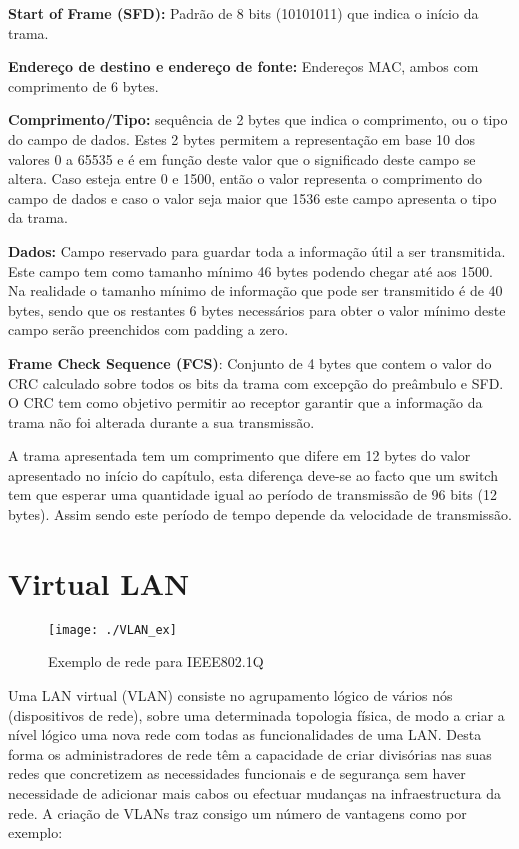 \documentclass[a4paper]{IEEEtran}
\begin{document}
\textbf{Start of Frame (SFD):}  Padrão de 8 bits (10101011) que indica o início da trama.

\textbf{Endereço de destino e endereço de fonte:} Endereços MAC, ambos com comprimento de 6 bytes.

\textbf{Comprimento/Tipo:}  sequência de 2 bytes que indica o comprimento, ou o tipo do campo de dados. Estes 2 bytes permitem a representação em base 10 dos valores 0 a 65535 e é em função deste valor que o significado deste campo se altera. Caso esteja entre 0 e 1500, então o  valor representa o comprimento do campo de dados e caso o valor seja maior que 1536 este campo apresenta o tipo da trama.

\textbf{Dados:} Campo reservado para guardar toda a informação útil a ser transmitida. Este campo tem como tamanho mínimo 46 bytes podendo chegar até aos 1500. Na realidade o tamanho mínimo de informação que pode ser transmitido é de 40 bytes, sendo que os restantes 6 bytes necessários para obter o valor mínimo deste campo serão preenchidos com padding a zero.

\textbf{Frame Check Sequence (FCS)}: Conjunto de 4 bytes que contem o valor do CRC calculado sobre todos os bits da trama com excepção do preâmbulo e SFD. O CRC tem como objetivo permitir ao receptor garantir que a informação da trama não foi alterada durante a sua transmissão. 

A trama apresentada tem um comprimento que difere em 12 bytes do valor apresentado no início do capítulo, esta diferença deve-se ao facto que um switch tem que esperar uma quantidade igual ao período de transmissão de 96 bits (12 bytes). Assim sendo este período de tempo depende da velocidade de transmissão.

\section{Virtual LAN}
\label{sec:Virtual LAN}
 
 
 \begin{figure*}
 	\centering
 	\texttt{[image: ./VLAN\_ex]}
 	\caption{Exemplo de rede para IEEE802.1Q}
 	\label{fig:VLANex}
 \end{figure*}
 
Uma LAN virtual (VLAN) consiste no agrupamento lógico de vários nós (dispositivos de rede), sobre uma determinada topologia física, de modo a criar a nível lógico uma nova rede com todas as funcionalidades de uma LAN. Desta forma os administradores de rede têm a capacidade de criar divisórias nas suas redes que concretizem as necessidades funcionais e de segurança sem haver necessidade de adicionar mais cabos ou efectuar mudanças na infraestructura da rede.
A criação de VLANs traz consigo um número de vantagens como por exemplo:
\end{document}
